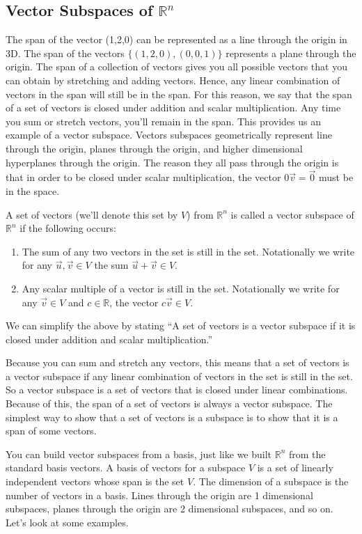   

\subsection{Vector Subspaces of ${\mathbb{R}}^n$}

The span of the vector (1,2,0) can be represented as a line through the origin in 3D.  The span of the vectors $\{(1,2,0), (0,0,1)\}$ represents a plane through the origin. The span of a collection of vectors gives you all possible vectors that you can obtain by stretching and adding vectors. Hence, any linear combination of vectors in the span will still be in the span.  For this reason, we say that the span of a set of vectors is closed under addition and scalar multiplication.  Any time you sum or stretch vectors, you'll remain in the span.  This provides us an example of a vector subspace. Vectors subspaces geometrically represent line through the origin, planes through the origin, and higher dimensional hyperplanes through the origin.  The reason they all pass through the origin is that in order to be closed under scalar multiplication, the vector $0\vec v=\vec 0$ must be in the space.

A set of vectors (we'll denote this set by $V$) from $\mathbb{R}^n$ is called a vector subspace of $\mathbb{R}^n$ if the following occurs:
\begin{enumerate}
	\item The sum of any two vectors in the set is still in the set. Notationally we write for any $\vec u,\vec v\in V$ the sum $\vec u+\vec v\in V$. 
	\item Any scalar multiple of a vector is still in the set. Notationally we write for any $\vec v\in V$ and $c\in \mathbb{R}$, the vector $c\vec v\in V$. 
\end{enumerate}
We can simplify the above by stating ``A set of vectors is a vector subspace if it is closed under addition and scalar multiplication.'' 

Because you can sum and stretch any vectors, this means that a set of vectors is a vector subspace if any linear combination of vectors in the set is still in the set.  So a vector subspace is a set of vectors that is closed under linear combinations.
Because of this, the span of a set of vectors is always a vector subspace. The simplest way to show that a set of vectors is a subspace is to show that it is a span of some vectors.

You can build vector subspaces from a basis, just like we built $\mathbb{R}^n$ from the standard basis vectors. A basis of vectors for a subspace $V$ is a set of linearly independent vectors whose span is the set $V$.  The dimension of a subspace is the number of vectors in a basis. Lines through the origin are 1 dimensional subspaces, planes through the origin are 2 dimensional subspaces, and so on. Let's look at some examples.

